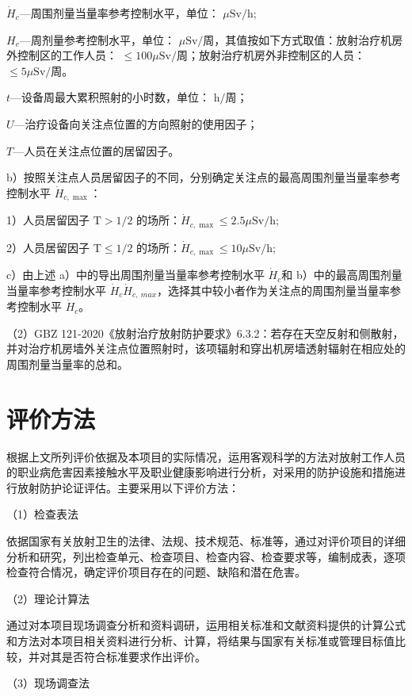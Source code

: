 $\dot { H } _ { c }$—周围剂量当量率参考控制水平，单位： $\mu \mathrm { S v / h }$;

$H _ { e }$—周剂量参考控制水平，单位： $\mu \mathrm { S v } /$周，其值按如下方式取值：放射治疗机房外控制区的工作人员： $\leq 1 0 0 \mu \mathrm { S v } /\text{周}$；放射治疗机房外非控制区的人员： ${ \le } 5 \mu \mathrm { S } \mathrm { v }/\text{周}$。

$t$—设备周最大累积照射的小时数，单位： $\mathrm { h }/\text{周}$；

$U$—治疗设备向关注点位置的方向照射的使用因子；

$T$—人员在关注点位置的居留因子。

b）按照关注点人员居留因子的不同，分别确定关注点的最高周围剂量当量率参考控制水平 $\dot{H}_{c,\max}$：

1）人员居留因子 $\mathrm{T}>1/2$ 的场所：$\dot{H}_{c,\max}\le2.5\mu\mathrm{Sv/h}$;

2）人员居留因子 $\mathrm{T}\le1/2$ 的场所：$\dot{H}_{c,\max}\le10\mu\mathrm{Sv/h}$;

c）由上述 a）中的导出周围剂量当量率参考控制水平 $\dot { H } _ { c }$和 b）中的最高周围剂量当量率参考控制水平 $\dot { H } _ { c }$$\dot { H } _ { c , \ m a x }$，选择其中较小者作为关注点的周围剂量当量率参考控制水平 $\dot { H } _ { c }$。

（2）GBZ 121-2020《放射治疗放射防护要求》6.3.2：若存在天空反射和侧散射，并对治疗机房墙外关注点位置照射时，该项辐射和穿出机房墙透射辐射在相应处的周围剂量当量率的总和。

\section{评价方法}

根据上文所列评价依据及本项目的实际情况，运用客观科学的方法对放射工作人员的职业病危害因素接触水平及职业健康影响进行分析，对采用的防护设施和措施进行放射防护论证评估。主要采用以下评价方法：

（1）检查表法

依据国家有关放射卫生的法律、法规、技术规范、标准等，通过对评价项目的详细分析和研究，列出检查单元、检查项目、检查内容、检查要求等，编制成表，逐项检查符合情况，确定评价项目存在的问题、缺陷和潜在危害。

（2）理论计算法

通过对本项目现场调查分析和资料调研，运用相关标准和文献资料提供的计算公式和方法对本项目相关资料进行分析、计算，将结果与国家有关标准或管理目标值比较，并对其是否符合标准要求作出评价。

（3）现场调查法

